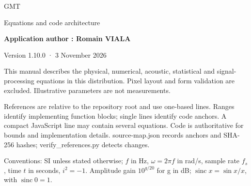 \documentclass[10pt,a4paper]{article}
\newcommand{\sinc}{\operatorname{sinc}}\newcommand{\clip}{\operatorname{clip}}\newcommand{\diag}{\operatorname{diag}}\newcommand{\Rea}{\operatorname{Re}}\newcommand{\rms}{\operatorname{RMS}}
\begin{document}
{\sffamily\color{ink}\Huge GMT\par}\vspace{3mm}
{\sffamily\Large Equations and code architecture\par}\vspace{5mm}
\textbf{Application author : Romain VIALA}\par
Version 1.10.0 · 3 November 2026\par

This manual describes the physical, numerical, acoustic, statistical and signal-processing equations in this distribution. Pixel layout and form validation are excluded. Illustrative parameters are not measurements.\par

References are relative to the repository root and use one-based lines. Ranges identify implementing function blocks; single lines identify code anchors. A compact JavaScript line may contain several equations. Code is authoritative for bounds and implementation details. source-map.json records anchors and SHA-256 hashes; verify\_references.py detects changes.\par

Conventions: SI unless stated otherwise; $f$ in Hz, $\omega=2\pi f$ in rad/s, sample rate $f_s$, time $t$ in seconds, $i^2=-1$. Amplitude gain $10^{g/20}$ for g in dB; $\sinc x=\sin x/x$, with $\sinc0=1$.\par
\clearpage\tableofcontents\clearpage
\end{document}
